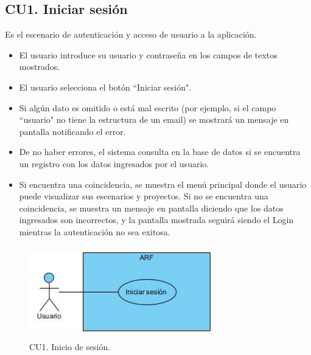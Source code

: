 \subsection{CU1. Iniciar sesión}\par
Es el escenario de autenticación y acceso de usuario a la aplicación. 
\begin{itemize}
	\item El usuario introduce su usuario y contraseña en los campos de textos mostrados.
	\item El usuario selecciona el botón ``Iniciar sesión".
	\item Si algún dato es omitido o está mal escrito (por ejemplo, si el campo ``usuario" no tiene la estructura de un email) se mostrará un mensaje en pantalla notificando el error.
	\item De no haber errores, el sistema consulta en la base de datos si se encuentra un registro con los datos ingresados por el usuario.
	\item Si encuentra una coincidencia, se muestra el menú principal donde el usuario puede visualizar sus escenarios y proyectos. Si no se encuentra una coincidencia, se muestra un mensaje en pantalla diciendo que los datos ingresados son incorrectos, y la pantalla mostrada seguirá siendo el Login mientras la autenticación no sea exitosa.
\end{itemize}

\begin{figure}[!htbp]
	\centering
	\includegraphics[width=8cm,height=4cm]{imagenes/analisis/cu/iniciar_sesion.jpg}
	\caption{CU1. Inicio de sesión.}
	\label{fig:iniciosesion}
\end{figure} 

